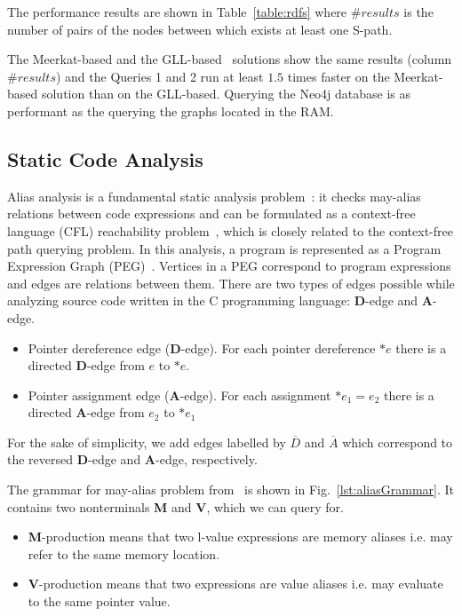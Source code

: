 The performance results are shown in Table~\ref{table:rdfs} where $\#results$ is the number of pairs of the nodes between which exists at least one S-path.

The Meerkat-based and the GLL-based~\cite{GrigorevR16} solutions show the same results (column $\#results$) and the Queries 1 and 2 run at least $1.5$ times faster on the Meerkat-based solution than on the GLL-based. Querying the Neo4j database is as performant as the querying the graphs located in the RAM.


\subsection{Static Code Analysis}

Alias analysis is a fundamental static analysis problem~\cite{Marlowe}: it checks may-alias relations between code expressions and can be formulated as a context-free language (CFL) reachability problem~\cite{Reps}, which is closely related to the context-free path querying problem.
In this analysis, a program is represented as a Program Expression Graph (PEG)~\cite{Zheng}.
Vertices in a PEG correspond to program expressions and edges are relations between them.
There are two types of edges possible while analyzing source code written in the C programming language: \textbf{D}-edge and \textbf{A}-edge.

\begin{itemize}
    \item Pointer dereference edge (\textbf{D}-edge). For each pointer dereference $*e$ there is a directed \textbf{D}-edge from $e$ to $*e$.
    \item Pointer assignment edge (\textbf{A}-edge). For each assignment $*e_1=e_2$ there is a directed \textbf{A}-edge from $e_2$ to $*e_1$
\end{itemize}

For the sake of simplicity, we add edges labelled by $\overline{D}$ and $\overline{A}$ which correspond to the reversed \textbf{D}-edge and \textbf{A}-edge, respectively.

The grammar for may-alias problem from~\cite{Zheng} is shown in Fig.~\ref{lst:aliasGrammar}.
It contains two nonterminals \textbf{M} and \textbf{V}, which we can query for.

\begin{itemize}
    \item \textbf{M}-production means that two l-value expressions are memory aliases i.e. may refer to the same memory location.
    \item \textbf{V}-production means that two expressions are value aliases i.e. may evaluate to the same pointer value.
\end{itemize}

